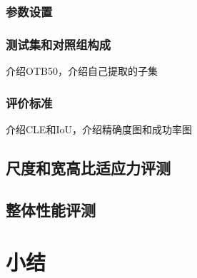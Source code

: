\subsubsection{参数设置}
\subsubsection{测试集和对照组构成}
介绍OTB50，介绍自己提取的子集
\subsubsection{评价标准}
介绍CLE和IoU，介绍精确度图和成功率图
\subsection{尺度和宽高比适应力评测}
\subsection{整体性能评测}

\section{小结}
